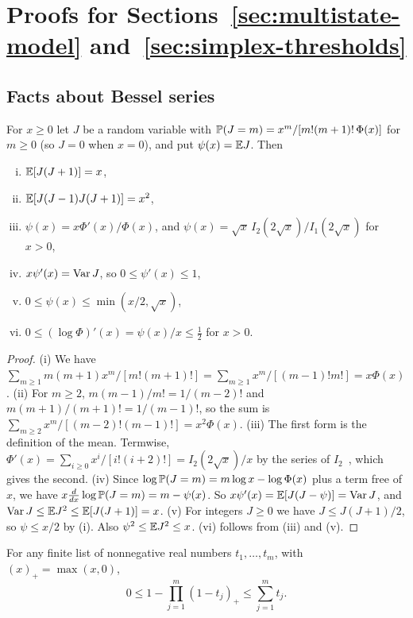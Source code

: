 \section{\texorpdfstring{Proofs for Sections~\ref{sec:multistate-model}
and~\ref{sec:simplex-thresholds}}{Proofs for Sections 2 and 3}}\label{app:thresholds}

\subsection{Facts about Bessel series}

\begin{lemma}\label{lem:bessel-law}
For $x\ge0$ let $J$ be a random variable with
$\mathbb P(J=m)=x^m/[m!(m+1)!\,\Phi(x)]$ for $m\ge0$ (so $J=0$ when $x=0$), and put
$\psi(x)=\mathbb E J$. Then
\begin{enumerate}[(i)]
\item $\mathbb E[J(J+1)]=x$,
\item $\mathbb E[J(J-1)J(J+1)]=x^2$,
\item $\psi(x)=x\Phi'(x)/\Phi(x)$, and $\psi(x)=\sqrt x\,I_2(2\sqrt x)/I_1(2\sqrt x)$
for $x>0$,
\item $x\psi'(x)=\operatorname{Var} J$, so $0\le\psi'(x)\le1$,
\item $0\le\psi(x)\le\min(x/2,\sqrt x)$,
\item $0\le(\log\Phi)'(x)=\psi(x)/x\le\frac12$ for $x>0$.
\end{enumerate}
\end{lemma}

\begin{proof}
(i) We have $\sum_{m\ge1}m(m+1)x^m/[m!(m+1)!]=\sum_{m\ge1}x^m/[(m-1)!m!]=x\Phi(x)$.
(ii) For $m\ge2$, $m(m-1)/m!=1/(m-2)!$ and $m(m+1)/(m+1)!=1/(m-1)!$, so the sum is
$\sum_{m\ge2}x^m/[(m-2)!(m-1)!]=x^2\Phi(x)$.
(iii) The first form is the definition of the mean. Termwise,
$\Phi'(x)=\sum_{i\ge0}x^i/[i!(i+2)!]=I_2(2\sqrt x)/x$ by the series of
$I_2$~\cite[Eq.~10.25.2]{dlmf}, which gives the second.
(iv) Since $\log\mathbb P(J=m)=m\log x-\log\Phi(x)$ plus a term free of $x$, we
have $x\frac d{dx}\log\mathbb P(J=m)=m-\psi(x)$. So $x\psi'(x)=\mathbb E[J(J-\psi)]=\operatorname{Var} J$,
and $\operatorname{Var} J\le\mathbb E J^2\le\mathbb E[J(J+1)]=x$.
(v) For integers $J\ge0$ we have $J\le J(J+1)/2$, so $\psi\le x/2$ by (i). Also
$\psi^2\le\mathbb E J^2\le x$.
(vi) follows from (iii) and (v).
\end{proof}

\begin{lemma}\label{lem:clipped-product}
For any finite list of nonnegative real numbers $t_1,\ldots,t_m$, with
$(x)_+=\max(x,0)$,
\[
0\le1-\prod_{j=1}^m(1-t_j)_+\le\sum_{j=1}^mt_j.
\]
\end{lemma}

